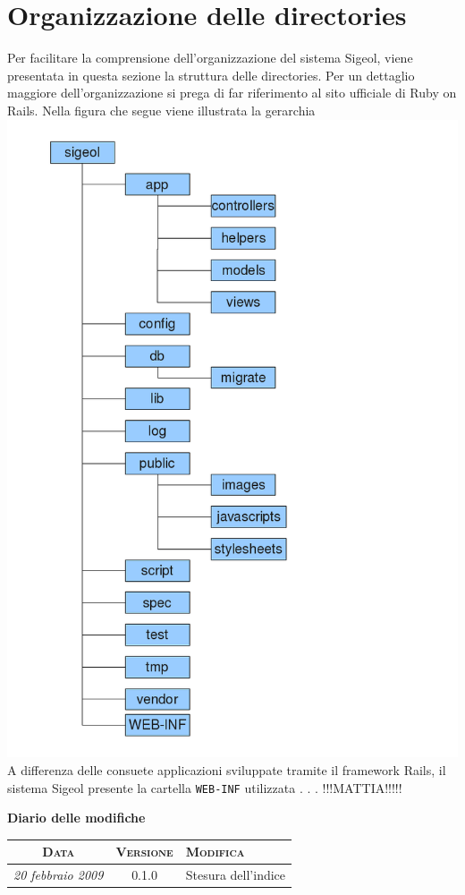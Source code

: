 \documentclass[11pt,a4paper]{article}
\newcommand{\modifiche} 
{
\newpage
\begin{center}
\textbf{Diario delle modifiche} \\
\bigskip
\begin{tabular}{|c|c|p{0.51\textwidth}|}
\hline
\textsc{Data} & \textsc{Versione} & \textsc{Modifica} \\
\hline
\hline
\textit{20 febbraio 2009} & 0.1.0 & Stesura dell'indice \\
\hline
\end{tabular}
\end{center}
}
\begin{document}
\section{Organizzazione delle directories}
Per facilitare la comprensione dell'organizzazione del sistema Sigeol, viene presentata in questa sezione la struttura delle directories. Per un dettaglio maggiore dell'organizzazione si prega di far riferimento al sito ufficiale di Ruby on Rails. Nella figura che segue viene illustrata la gerarchia \\
\includegraphics[scale=0.59]{images/gerarchiacartelle.png}
A differenza delle consuete applicazioni sviluppate tramite il framework Rails, il sistema Sigeol presente la cartella \verb|WEB-INF| utilizzata . . . !!!MATTIA!!!!!

\modifiche
\end{document}
